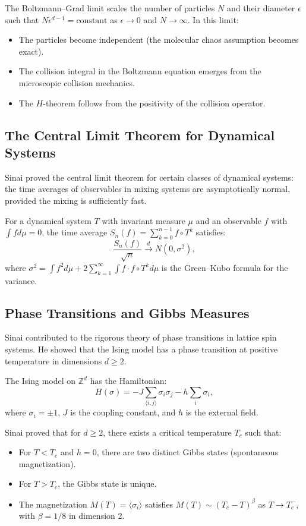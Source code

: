 The Boltzmann--Grad limit scales the number of particles $N$ and their diameter $\epsilon$ such that $N \epsilon^{d-1} = \text{constant}$ as $\epsilon \to 0$ and $N \to \infty$. In this limit:
\begin{itemize}
\item The particles become independent (the molecular chaos assumption becomes exact).
\item The collision integral in the Boltzmann equation emerges from the microscopic collision mechanics.
\item The $H$-theorem follows from the positivity of the collision operator.
\end{itemize}

\subsection{The Central Limit Theorem for Dynamical Systems}

Sinai proved the central limit theorem for certain classes of dynamical systems: the time averages of observables in mixing systems are asymptotically normal, provided the mixing is sufficiently fast.

For a dynamical system $T$ with invariant measure $\mu$ and an observable $f$ with $\int f d\mu = 0$, the time average $S_n(f) = \sum_{k=0}^{n-1} f \circ T^k$ satisfies:
\[
\frac{S_n(f)}{\sqrt{n}} \xrightarrow{d} N(0, \sigma^2),
\]
where $\sigma^2 = \int f^2 d\mu + 2\sum_{k=1}^\infty \int f \cdot f \circ T^k d\mu$ is the Green--Kubo formula for the variance.

\subsection{Phase Transitions and Gibbs Measures}

Sinai contributed to the rigorous theory of phase transitions in lattice spin systems. He showed that the Ising model has a phase transition at positive temperature in dimensions $d \geq 2$.

The Ising model on $\mathbb{Z}^d$ has the Hamiltonian:
\[
H(\sigma) = -J \sum_{\langle i,j \rangle} \sigma_i \sigma_j - h \sum_i \sigma_i,
\]
where $\sigma_i = \pm 1$, $J$ is the coupling constant, and $h$ is the external field.

Sinai proved that for $d \geq 2$, there exists a critical temperature $T_c$ such that:
\begin{itemize}
\item For $T < T_c$ and $h = 0$, there are two distinct Gibbs states (spontaneous magnetization).
\item For $T > T_c$, the Gibbs state is unique.
\item The magnetization $M(T) = \langle \sigma_i \rangle$ satisfies $M(T) \sim (T_c - T)^\beta$ as $T \to T_c^-$, with $\beta = 1/8$ in dimension 2.
\end{itemize}

